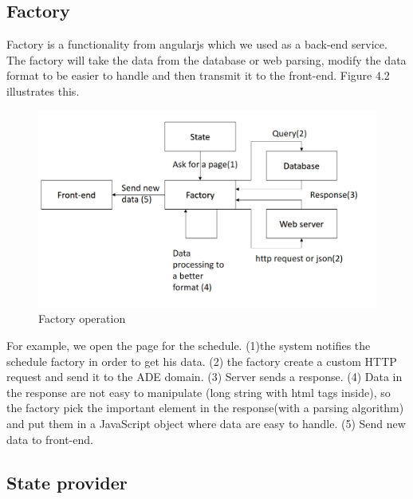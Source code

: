 \documentclass[11pt, a4paper]{report}
\begin{document}
\subsection{Factory}

Factory is a functionality from angularjs which we used as a back-end service. The factory will take the data from the database or web parsing, modify the data format to be easier to handle and then transmit it to the front-end. Figure 4.2 illustrates this.\\

\begin{figure}
\centering
\includegraphics[scale = 0.3]{Images/factory_arch.png}
\caption{Factory operation}
\end{figure}

For example, we open the page for the schedule. (1)the system notifies the schedule factory in order to get his data. (2) the factory create a custom HTTP request and send it to the ADE domain. (3) Server sends a response. (4) Data in the response are not easy to manipulate (long string with html tags inside), so the factory pick the important element in the response(with a parsing algorithm) and put them in a JavaScript object where data are easy to handle. (5) Send new data to front-end.

\subsection{State provider}
\end{document}
